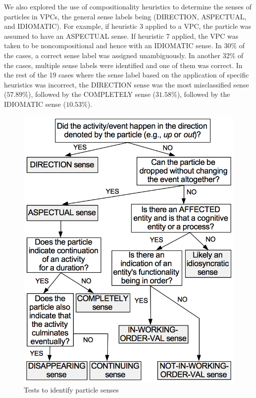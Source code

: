 \documentclass[output=paper,modfonts,nonflat]{langsci/langscibook}
\begin{document}
\largerpage[2]
We also explored the use of compositionality heuristics to determine the senses of particles in VPCs, the general sense labels being (DIRECTION, ASPECTUAL, and IDIOMATIC). For example, if heuristic 3 applied to a VPC, the particle was assumed to have an ASPECTUAL sense. If heuristic 7 applied, the VPC was taken to be noncompositional and hence with an IDIOMATIC sense. In $30\%$ of the cases, a correct sense label was assigned unambiguously. In another $32\%$ of the cases, multiple sense labels were identified and one of them was correct. In the rest of the 19 cases where the sense label based on the application of specific heuristics was incorrect, the DIRECTION sense was the most misclassified sense ($57.89\%$), followed by the COMPLETELY sense ($31.58\%$), followed by the IDIOMATIC sense ($10.53\%$).
\clearpage 

   \begin{figure}[t]
\includegraphics[width=.66\textwidth]{figures/block_sense_uppercase}
\caption{Tests to identify particle senses}\label{fig:tests-senses}
\end{figure}
\end{document}
